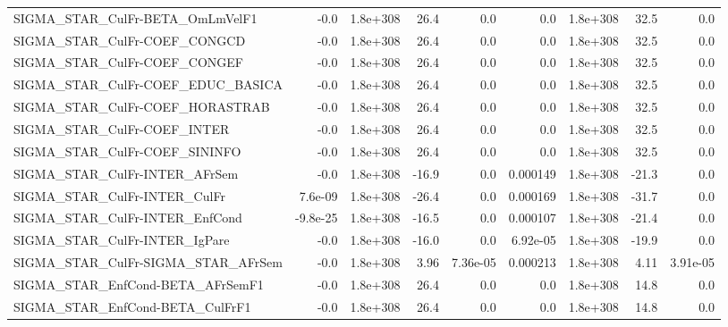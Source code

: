 \begin{tabular}{lrrrrrrrr}
SIGMA\_STAR\_CulFr-BETA\_OmLmVelF1       &        -0.0 &     1.8e+308 &    26.4 &      0.0 &        0.0 &    1.8e+308 &         32.5 &           0.0 \\
SIGMA\_STAR\_CulFr-COEF\_CONGCD          &        -0.0 &     1.8e+308 &    26.4 &      0.0 &        0.0 &    1.8e+308 &         32.5 &           0.0 \\
SIGMA\_STAR\_CulFr-COEF\_CONGEF          &        -0.0 &     1.8e+308 &    26.4 &      0.0 &        0.0 &    1.8e+308 &         32.5 &           0.0 \\
SIGMA\_STAR\_CulFr-COEF\_EDUC\_BASICA     &        -0.0 &     1.8e+308 &    26.4 &      0.0 &        0.0 &    1.8e+308 &         32.5 &           0.0 \\
SIGMA\_STAR\_CulFr-COEF\_HORASTRAB       &        -0.0 &     1.8e+308 &    26.4 &      0.0 &        0.0 &    1.8e+308 &         32.5 &           0.0 \\
SIGMA\_STAR\_CulFr-COEF\_INTER           &        -0.0 &     1.8e+308 &    26.4 &      0.0 &        0.0 &    1.8e+308 &         32.5 &           0.0 \\
SIGMA\_STAR\_CulFr-COEF\_SININFO         &        -0.0 &     1.8e+308 &    26.4 &      0.0 &        0.0 &    1.8e+308 &         32.5 &           0.0 \\
SIGMA\_STAR\_CulFr-INTER\_AFrSem         &        -0.0 &     1.8e+308 &   -16.9 &      0.0 &   0.000149 &    1.8e+308 &        -21.3 &           0.0 \\
SIGMA\_STAR\_CulFr-INTER\_CulFr          &     7.6e-09 &     1.8e+308 &   -26.4 &      0.0 &   0.000169 &    1.8e+308 &        -31.7 &           0.0 \\
SIGMA\_STAR\_CulFr-INTER\_EnfCond        &    -9.8e-25 &     1.8e+308 &   -16.5 &      0.0 &   0.000107 &    1.8e+308 &        -21.4 &           0.0 \\
SIGMA\_STAR\_CulFr-INTER\_IgPare         &        -0.0 &     1.8e+308 &   -16.0 &      0.0 &   6.92e-05 &    1.8e+308 &        -19.9 &           0.0 \\
SIGMA\_STAR\_CulFr-SIGMA\_STAR\_AFrSem    &        -0.0 &     1.8e+308 &    3.96 & 7.36e-05 &   0.000213 &    1.8e+308 &         4.11 &      3.91e-05 \\
SIGMA\_STAR\_EnfCond-BETA\_AFrSemF1      &        -0.0 &     1.8e+308 &    26.4 &      0.0 &        0.0 &    1.8e+308 &         14.8 &           0.0 \\
SIGMA\_STAR\_EnfCond-BETA\_CulFrF1       &        -0.0 &     1.8e+308 &    26.4 &      0.0 &        0.0 &    1.8e+308 &         14.8 &           0.0 \\

\end{tabular}
